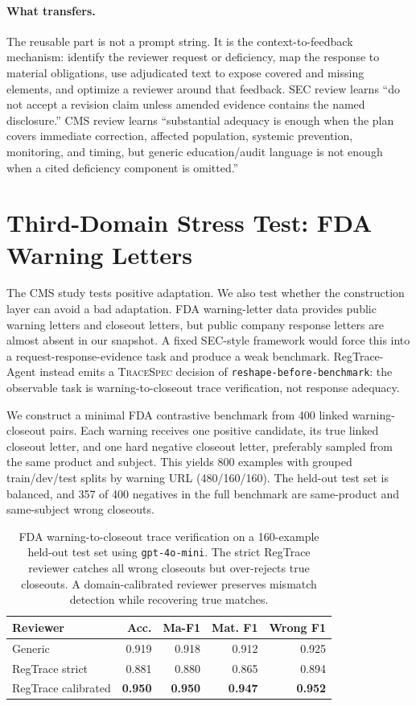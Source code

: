 \documentclass[11pt]{article}
\newcommand{\framework}{RegTrace-Agent}
\begin{document}
\paragraph{What transfers.}
The reusable part is not a prompt string. It is the context-to-feedback mechanism: identify the reviewer request or deficiency, map the response to material obligations, use adjudicated text to expose covered and missing elements, and optimize a reviewer around that feedback. SEC review learns ``do not accept a revision claim unless amended evidence contains the named disclosure.'' CMS review learns ``substantial adequacy is enough when the plan covers immediate correction, affected population, systemic prevention, monitoring, and timing, but generic education/audit language is not enough when a cited deficiency component is omitted.''

\section{Third-Domain Stress Test: FDA Warning Letters}
\label{sec:fda}

The CMS study tests positive adaptation. We also test whether the construction layer can avoid a bad adaptation. FDA warning-letter data provides public warning letters and closeout letters, but public company response letters are almost absent in our snapshot. A fixed SEC-style framework would force this into a request-response-evidence task and produce a weak benchmark. \framework{} instead emits a \textsc{TraceSpec} decision of \texttt{reshape-before-benchmark}: the observable task is warning-to-closeout trace verification, not response adequacy.

We construct a minimal FDA contrastive benchmark from 400 linked warning-closeout pairs. Each warning receives one positive candidate, its true linked closeout letter, and one hard negative closeout letter, preferably sampled from the same product and subject. This yields 800 examples with grouped train/dev/test splits by warning URL (480/160/160). The held-out test set is balanced, and 357 of 400 negatives in the full benchmark are same-product and same-subject wrong closeouts.

\begin{table}[t]
\centering
\scriptsize
\setlength{\tabcolsep}{2.5pt}
\begin{tabular}{lrrrr}
\toprule
\textbf{Reviewer} & \textbf{Acc.} & \textbf{Ma-F1} & \textbf{Mat. F1} & \textbf{Wrong F1} \\
\midrule
Generic & 0.919 & 0.918 & 0.912 & 0.925 \\
RegTrace strict & 0.881 & 0.880 & 0.865 & 0.894 \\
RegTrace calibrated & \textbf{0.950} & \textbf{0.950} & \textbf{0.947} & \textbf{0.952} \\
\bottomrule
\end{tabular}
\caption{FDA warning-to-closeout trace verification on a 160-example held-out test set using \texttt{gpt-4o-mini}. The strict RegTrace reviewer catches all wrong closeouts but over-rejects true closeouts. A domain-calibrated reviewer preserves mismatch detection while recovering true matches.}
\label{tab:fda}
\end{table}
\end{document}
